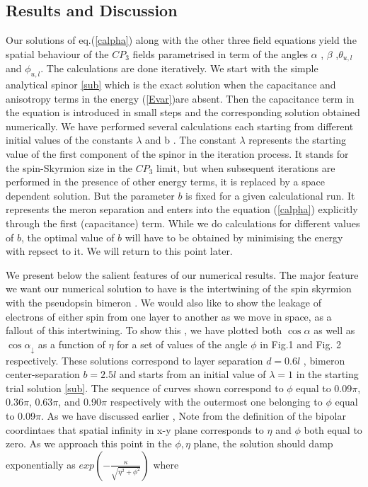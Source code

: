 \subsection{Results and Discussion}
Our solutions of eq.(\ref{calpha}) along with the other three
field equations
yield the spatial behaviour of the $CP_{3}$ fields
parametrised in term of the angles $\alpha$ , $\beta$ ,$\theta_{u,l}$
and $\phi_{u,l}$. The calculations are done iteratively. We start with 
the simple analytical spinor \ref{sub} which is the exact solution 
when the capacitance and anisotropy terms in the energy (\ref{Evar})are 
absent. Then the capacitance term in the equation is 
introduced in small steps and the corresponding solution obtained 
numerically.
We have performed several calculations each starting from
different initial values of the constants 
$\lambda$ and b . The constant 
$\lambda$ represents the starting value of the first component 
of the spinor in the iteration process. It stands for the spin-Skyrmion 
size in the $CP_3$ limit, but when subsequent iterations are performed 
in the presence of other energy terms, it is replaced by a space 
dependent solution. But the parameter $b$ is fixed for a given 
calculational run. It represents the meron separation and enters into the 
equation (\ref{calpha})
explicitly through the first (capacitance) term. While we do calculations
for different values of $b$, the optimal value of $b$ will
have to be obtained by minimising the energy with repsect to it.
We will return to this point later.

We present below the salient features of our numerical results.
The major feature we want our numerical solution to have
is the intertwining of the spin skyrmion with the pseudopsin
bimeron . We would also like to show the leakage of electrons of either spin
from one layer to another as we move in space,
as a fallout of this intertwining. To show this
, we have plotted both $\cos \alpha$ as well as $\cos
\alpha_{\downarrow}$ as a function of $\eta$ for a set of values
of the angle $\phi$ in Fig.1 and Fig. 2 respectively.
These solutions correspond to layer separation $ d= 0.6l$ ,
bimeron center-separation $b = 2.5l$ and starts from an initial value
of $\lambda = 1$ in the starting trial solution \ref{sub}.
The sequence of curves shown
correspond to $\phi$ equal to 0.09$\pi$, 0.36$\pi$, 0.63$\pi$, and 0.90$\pi$
respectively with the outermost one belonging to $\phi$ equal to 0.09$\pi$. 
As we have discussed earlier \cite{Ghosh2},
Note from the definition of the bipolar coordintaes
that spatial infinity in x-y plane corresponds to $\eta$ and $\phi$ both
equal to zero. As we approach this point in the $\phi , \eta$ plane,
the solution
should damp exponentially as
$exp(-\frac{\kappa}{\sqrt{\eta^{2}+\phi^{2}}})$ where

